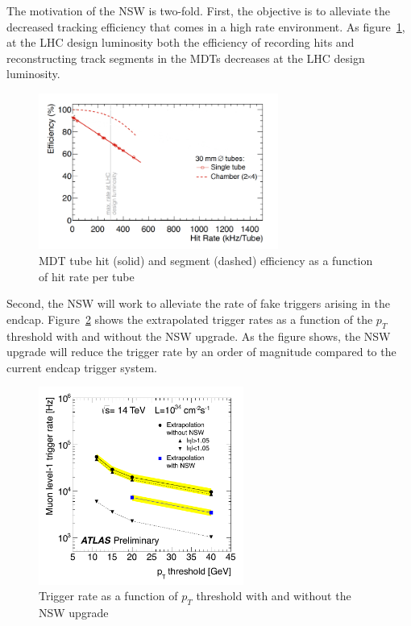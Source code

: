 The motivation of the NSW is two-fold. First, the objective is to alleviate the decreased tracking efficiency that comes in a high rate environment. As figure~\ref{fig:mdt_hit_rate}, at the LHC design luminosity both the efficiency of recording hits and reconstructing track segments in the MDTs decreases at the LHC design luminosity. 

\begin{figure}[h!]
  \centering
  \captionsetup{justification=centering}

  \includegraphics[width=0.7\textwidth]{figures/MDT_hit_rate}
   \caption{MDT tube hit (solid) and segment (dashed) efficiency as a function of hit rate per tube~\cite{NSW_TDR}}
  \label{fig:mdt_hit_rate}
\end{figure}

Second, the NSW will work to alleviate the rate of fake triggers arising in the endcap. Figure~\ref{fig:NSW_trig} shows the extrapolated trigger rates as a function of the $p_{T}$ threshold with and without the NSW upgrade. As the figure shows, the NSW upgrade will reduce the trigger rate by an order of magnitude compared to the current endcap trigger system. 

\begin{figure}[h!]
  \centering
  \captionsetup{justification=centering}

  \includegraphics[width=0.6\textwidth]{figures/NSW_trigger_rate}
   \caption{Trigger rate as a function of $p_{T}$ threshold with and without the NSW upgrade~\cite{NSW_TDR}}
  \label{fig:NSW_trig}
\end{figure}


